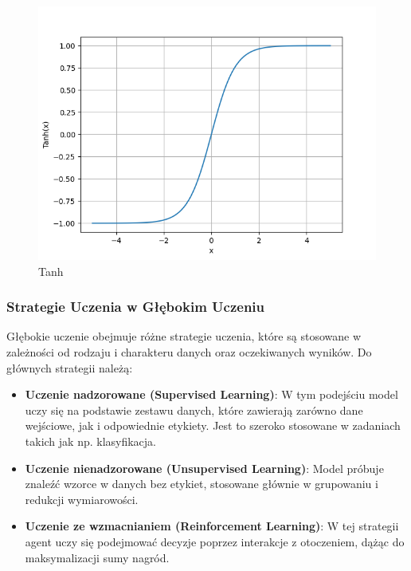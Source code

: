 \begin{figure}[ht]
    \begin{minipage}[t]{0.3\linewidth}
        \includegraphics[width=\linewidth]{Rozdziały/02.Podstawy_teoretyczne/tanh.png}
        \caption{Tanh}
        \label{fig:image16}
    \end{minipage}
\end{figure}


\subsubsection*{Strategie Uczenia w Głębokim Uczeniu}
Głębokie uczenie obejmuje różne strategie uczenia, które są stosowane w zależności od rodzaju i charakteru danych oraz oczekiwanych wyników. Do głównych strategii należą:

\begin{itemize}
    \item \textbf{Uczenie nadzorowane (Supervised Learning)}: W tym podejściu model uczy się na podstawie zestawu danych, które zawierają zarówno dane wejściowe, jak i odpowiednie etykiety. Jest to szeroko stosowane w zadaniach takich jak np. klasyfikacja.
    \item \textbf{Uczenie nienadzorowane (Unsupervised Learning)}: Model próbuje znaleźć wzorce w danych bez etykiet, stosowane głównie w grupowaniu i redukcji wymiarowości.
    \item \textbf{Uczenie ze wzmacnianiem (Reinforcement Learning)}: W tej strategii agent uczy się podejmować decyzje poprzez interakcje z otoczeniem, dążąc do maksymalizacji sumy nagród.
\end{itemize}


